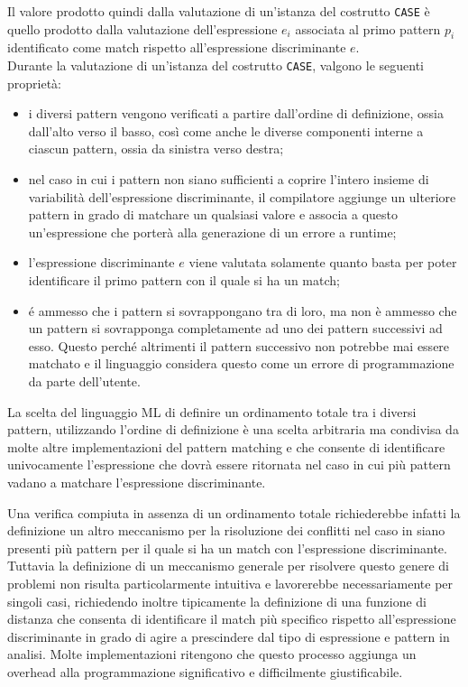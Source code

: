 Il valore prodotto quindi dalla valutazione di un'istanza del costrutto
\texttt{CASE} è quello prodotto dalla valutazione dell’espressione $e_i$
associata al primo pattern $p_i$ identificato come match rispetto
all’espressione discriminante $e$.\\

Durante la valutazione di un'istanza del costrutto \texttt{CASE}, valgono le
seguenti proprietà:

\begin{itemize}

\item i diversi pattern vengono verificati a partire dall’ordine di definizione,
ossia dall’alto verso il basso, così come anche le diverse componenti interne a
ciascun pattern, ossia da sinistra verso destra;

\item nel caso in cui i pattern non siano sufficienti a coprire l’intero insieme
di variabilità dell’espressione discriminante, il compilatore aggiunge un
ulteriore pattern in grado di matchare un qualsiasi valore e associa a questo
un’espressione che porterà alla generazione di un errore a runtime;

\item l’espressione discriminante $e$ viene valutata solamente quanto basta per
poter identificare il primo pattern con il quale si ha un match;

\item é ammesso che i pattern si sovrappongano tra di loro, ma non è ammesso che
un pattern si sovrapponga completamente ad uno dei pattern successivi ad esso.
Questo perché altrimenti il pattern successivo non potrebbe mai essere matchato
e il linguaggio considera questo come un errore di programmazione da parte
dell'utente.

\end{itemize}

La scelta del linguaggio ML di definire un ordinamento totale tra i diversi
pattern, utilizzando l’ordine di definizione è una scelta arbitraria ma
condivisa da molte altre implementazioni del pattern matching e che consente di
identificare univocamente l'espressione che dovrà essere ritornata nel caso in
cui più pattern vadano a matchare l'espressione discriminante.

Una verifica compiuta in assenza di un ordinamento totale richiederebbe infatti
la definizione un altro meccanismo per la risoluzione dei conflitti nel caso in
siano presenti più pattern per il quale si ha un match con l’espressione
discriminante. Tuttavia la definizione di un meccanismo generale per risolvere
questo genere di problemi non risulta particolarmente intuitiva e lavorerebbe
necessariamente per singoli casi, richiedendo inoltre tipicamente la definizione
di una funzione di distanza che consenta di identificare il match più specifico
rispetto all’espressione discriminante in grado di agire a prescindere dal tipo
di espressione e pattern in analisi. Molte implementazioni ritengono che questo
processo aggiunga un overhead alla programmazione significativo e difficilmente
giustificabile.

